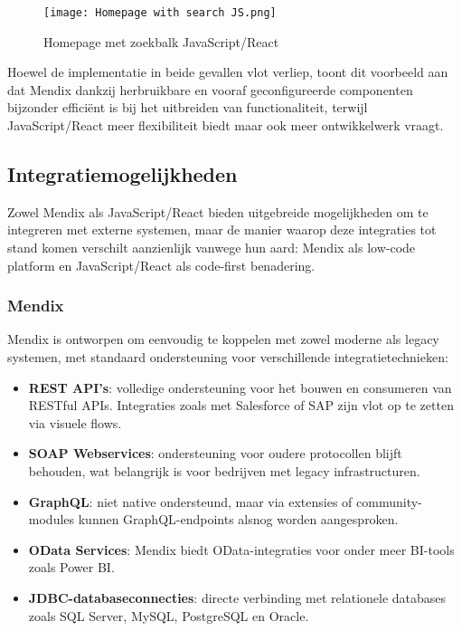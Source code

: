 \begin{figure}[H]
    \centering
    \texttt{[image: Homepage with search JS.png]}
    \caption[\centering Homepage with search bar JavaScript/React]{\label{fig:homepage-with-search-JS} Homepage met zoekbalk JavaScript/React}
\end{figure}


 Hoewel de implementatie in beide gevallen vlot verliep, toont dit voorbeeld aan dat Mendix dankzij herbruikbare en vooraf geconfigureerde componenten bijzonder efficiënt is bij het uitbreiden van functionaliteit, terwijl JavaScript/React meer flexibiliteit biedt maar ook meer ontwikkelwerk vraagt.


\subsection{Integratiemogelijkheden}

Zowel Mendix als JavaScript/React bieden uitgebreide mogelijkheden om te integreren met externe systemen, maar de manier waarop deze integraties tot stand komen verschilt aanzienlijk vanwege hun aard: Mendix als low-code platform en JavaScript/React als code-first benadering.

\subsubsection{Mendix}

Mendix is ontworpen om eenvoudig te koppelen met zowel moderne als legacy systemen, met standaard ondersteuning voor verschillende integratietechnieken:
\begin{itemize}
    \item \textbf{REST \gls{API}'s}: volledige ondersteuning voor het bouwen en consumeren van RESTful APIs. Integraties zoals met Salesforce of SAP zijn vlot op te zetten via visuele flows.
    \item \textbf{SOAP Webservices}: ondersteuning voor oudere protocollen blijft behouden, wat belangrijk is voor bedrijven met legacy infrastructuren.
    \item \textbf{GraphQL}: niet native ondersteund, maar via extensies of community-modules kunnen GraphQL-endpoints alsnog worden aangesproken.
    \item \textbf{OData Services}: Mendix biedt OData-integraties voor onder meer BI-tools zoals Power BI.
    \item \textbf{JDBC-databaseconnecties}: directe verbinding met relationele databases zoals SQL Server, MySQL, PostgreSQL en Oracle.
\end{itemize}

